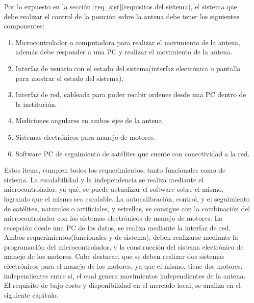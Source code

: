 Por lo expuesto en la sección \ref{req_sist}(requisitos del sistema), el sistema que debe realizar el control de la posición sobre la antena debe tener los siguientes componentes: 

\begin{enumerate}
	\item Microcontrolador o computadora para realizar el movimiento de la antena, además debe responder a una PC y realizar el movimiento de la antena.    
	\item Interfaz de usuario con el estado del sistema(interfaz electrónica o pantalla para mostrar el estado del sistema).
	\item Interfaz de red, cableada para poder recibir ordenes desde una PC dentro de la institución. 
	\item Mediciones angulares en ambos ejes de la antena.  
	\item Sistemas electrónicos para manejo de motores. 
	\item Software PC de seguimiento de satélites que cuente con conectividad a la red.  
\end{enumerate}

Estos items, cumplen todos los requerimientos, tanto funcionales como de sistema. La escalabilidad y la independencia  se realiza mediante el microcontrolador, ya qué, se puede actualizar el software sobre el mismo, logrando que el mismo sea escalable. La autocalibración, 
control, y el seguimiento de satélites, naturales o artificiales, y estrellas, se consigue con la combinación del microcontrolador con los sistemas electrónicos de manejo de motores. La recepción desde una PC de los datos, se realiza mediante la interfaz de red. Ambos requerimientos(funcionales y de sistema), deben realizarse mediante la programación del microcontrolador, y la construcción del sistema electrónico de manejo de los motores. Cabe destacar, que se deben realizar dos sistemas electrónicos para el manejo de los motores, ya que el mismo, tiene dos motores, independientes entre si, el cual genera movimientos independientes de la antena. El requisito de bajo costo y disponibilidad en el mercado local, se analiza en el siguiente capítulo. 



